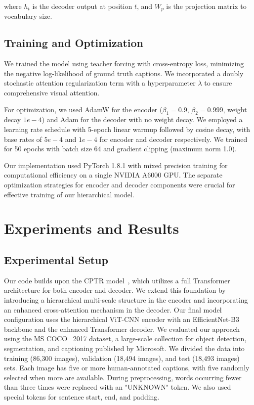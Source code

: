 \documentclass[10pt,twocolumn,letterpaper]{article}
\begin{document}
where $h_t$ is the decoder output at position $t$, and $W_p$ is the projection matrix to vocabulary size.

\subsection{Training and Optimization}

We trained the model using teacher forcing with cross-entropy loss, minimizing the negative log-likelihood of ground truth captions. We incorporated a doubly stochastic attention regularization term with a hyperparameter $\lambda$ to ensure comprehensive visual attention.

For optimization, we used AdamW for the encoder ($\beta_1 = 0.9$, $\beta_2 = 0.999$, weight decay $1e-4$) and Adam for the decoder with no weight decay. We employed a learning rate schedule with 5-epoch linear warmup followed by cosine decay, with base rates of $5e-4$ and $1e-4$ for encoder and decoder respectively. We trained for 50 epochs with batch size 64 and gradient clipping (maximum norm 1.0).

Our implementation used PyTorch 1.8.1 with mixed precision training for computational efficiency on a single NVIDIA A6000 GPU. The separate optimization strategies for encoder and decoder components were crucial for effective training of our hierarchical model.

\section{Experiments and Results}

\subsection{Experimental Setup}

Our code builds upon the CPTR model~\cite{liu2101cptr}, which utilizes a full Transformer architecture for both encoder and decoder. We extend this foundation by introducing a hierarchical multi-scale structure in the encoder and incorporating an enhanced cross-attention mechanism in the decoder. Our final model configuration uses the hierarchical ViT-CNN encoder with an EfficientNet-B3 backbone and the enhanced Transformer decoder. We evaluated our approach using the MS COCO~\cite{COCO} 2017 dataset, a large-scale collection for object detection, segmentation, and captioning published by Microsoft. We divided the data into training (86,300 images), validation (18,494 images), and test (18,493 images) sets. Each image has five or more human-annotated captions, with five randomly selected when more are available. During preprocessing, words occurring fewer than three times were replaced with an "UNKNOWN" token. We also used special tokens for sentence start, end, and padding.
\end{document}
